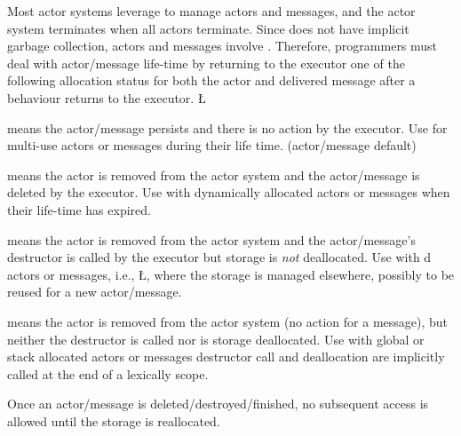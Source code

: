 \documentclass[openright,twoside]{report}
\begin{document}
Most actor systems leverage  to manage actors and messages, and the actor system terminates when all actors terminate.
Since \CC does not have implicit garbage collection, \uC actors and messages involve .
Therefore, programmers must deal with actor/message life-time by returning to the executor one of the following allocation status for both the actor and delivered message after a behaviour returns to the executor.
\LGinlinefalse\LGbegin\lgrinde
\L{}
\CE{}\endlgrinde\LGend
{}%
%
%
%
\vspace*{-15pt}%
\begin{prefix}
\item[\LGinlinetrue\LGbegin\lgrinde\L{\LB{\V{Nodelete}}}\endlgrinde\LGend{}] means the actor/message persists and there is no action by the executor.
Use for multi-use actors or messages during their life time. (actor/message default)
\item[\LGinlinetrue\LGbegin\lgrinde\L{\LB{\V{Delete}}}\endlgrinde\LGend{}] means the actor is removed from the actor system and the actor/message is deleted by the executor.
Use with dynamically allocated actors or messages when their life-time has expired.
\item[\LGinlinetrue\LGbegin\lgrinde\L{\LB{\V{Destroy}}}\endlgrinde\LGend{}] means the actor is removed from the actor system and the actor/message's destructor is called by the executor but storage is \emph{not} deallocated.
Use with d actors or messages, i.e., \LGinlinetrue\LGbegin\lgrinde\L{}\endlgrinde\LGend{}, where the storage is managed elsewhere, possibly to be reused for a new actor/message.
\item[\LGinlinetrue\LGbegin\lgrinde\L{\LB{\V{Finished}}}\endlgrinde\LGend{}] means the actor is removed from the actor system (no action for a message), but neither the destructor is called nor is storage deallocated.
Use with global or stack allocated actors or messages destructor call and deallocation are implicitly called at the end of a lexically scope.
\end{prefix}
Once an actor/message is deleted/destroyed/finished, no subsequent access is allowed until the storage is reallocated.
\end{document}
